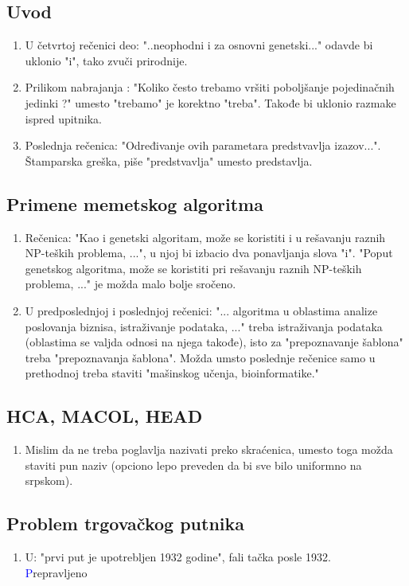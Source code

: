 \documentclass[a4paper]{report}
\newcommand{\odgovor}[1]{\textcolor{blue}{#1}}
\begin{document}
\subsection{Uvod}
\begin{enumerate}
  \item U četvrtoj rečenici deo:  "..neophodni i za osnovni genetski..."  odavde bi uklonio "i", tako zvuči prirodnije.
  \item Prilikom nabrajanja : "Koliko često trebamo vršiti poboljšanje pojedinačnih jedinki ?" umesto "trebamo" je korektno "treba". Takođe bi uklonio razmake ispred upitnika.
  \item Poslednja rečenica: "Određivanje ovih parametara predstvavlja izazov...". Štamparska greška, piše "predstvavlja" umesto predstavlja.
\end{enumerate}

\subsection{Primene memetskog algoritma}

\begin{enumerate}
  \item Rečenica: "Kao i genetski algoritam, može se koristiti i u rešavanju raznih
NP-teških problema, ...", u njoj bi izbacio dva ponavljanja slova "i". "Poput genetskog algoritma, može se koristiti pri rešavanju raznih NP-teških problema, ..." je možda malo bolje sročeno.
  \item U predposlednjoj i poslednjoj rečenici: "... algoritma u oblastima analize poslovanja biznisa, istraživanje podataka, ..." treba istraživanja podataka (oblastima se valjda odnosi na njega takođe), isto za "prepoznavanje šablona" treba "prepoznavanja šablona". Možda umsto poslednje rečenice samo u prethodnoj treba staviti "mašinskog učenja, bioinformatike."
\end{enumerate}

\subsection{HCA, MACOL, HEAD}
\begin{enumerate}
  \item Mislim da ne treba poglavlja nazivati preko skraćenica, umesto toga možda staviti pun naziv (opciono lepo preveden da bi sve bilo uniformno na srpskom).
\end{enumerate}

\subsection{Problem trgovačkog putnika}
\begin{enumerate}
  \item U: "prvi put je upotrebljen 1932 godine", fali tačka posle 1932.\\
\odgovor Prepravljeno \\
\end{enumerate}
\end{document}
